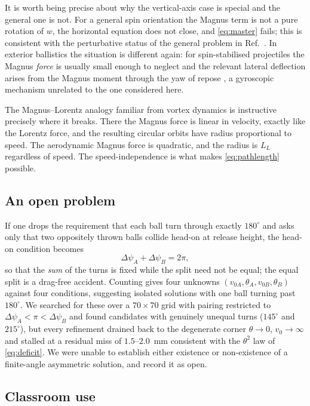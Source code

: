 \documentclass[aip,amsmath,amssymb,preprint,floatfix]{revtex4-2}
\newcommand{\LL}{L_{L}}
\begin{document}
It is worth being precise about why the vertical-axis case is special and the general
one is not. For a general spin orientation the Magnus term is not a pure rotation of
$w$, the horizontal equation does not close, and \eqref{eq:master} fails; this is
consistent with the perturbative status of the general problem in
Ref.~. In exterior ballistics the situation is
different again: for spin-stabilised projectiles the Magnus \emph{force} is usually
small enough to neglect and the relevant lateral deflection arises from the Magnus
moment through the yaw of repose \cite{McCoy2012}, a gyroscopic mechanism unrelated
to the one considered here.

The Magnus--Lorentz analogy familiar from vortex dynamics \cite{Sonin1997} is
instructive precisely where it breaks. There the Magnus force is linear in velocity,
exactly like the Lorentz force, and the resulting circular orbits have radius
proportional to speed. The aerodynamic Magnus force is quadratic, and the radius is
$\LL$ regardless of speed. The speed-independence is what makes \eqref{eq:pathlength}
possible.

\subsection{An open problem}

If one drops the requirement that each ball turn through exactly $180^\circ$ and asks
only that two oppositely thrown balls collide head-on at release height, the
head-on condition becomes
\begin{equation}
\Delta\psi_A+\Delta\psi_B = 2\pi ,
\end{equation}
so that the \emph{sum} of the turns is fixed while the split need not be equal; the
equal split is a drag-free accident. Counting gives four unknowns
$(v_{0A},\theta_A,v_{0B},\theta_B)$ against four conditions, suggesting isolated
solutions with one ball turning past $180^\circ$. We searched for these over a
$70\times70$ grid with pairing restricted to $\Delta\psi_A<\pi<\Delta\psi_B$ and found
candidates with genuinely unequal turns ($145^\circ$ and $215^\circ$), but every
refinement drained back to the degenerate corner $\theta\to0$, $v_0\to\infty$ and
stalled at a residual miss of $1.5$--$2.0$~mm consistent with the $\theta^2$ law of
\eqref{eq:deficit}. We were unable to establish either existence or non-existence of a
finite-angle asymmetric solution, and record it as open.

\subsection{Classroom use}
\end{document}
